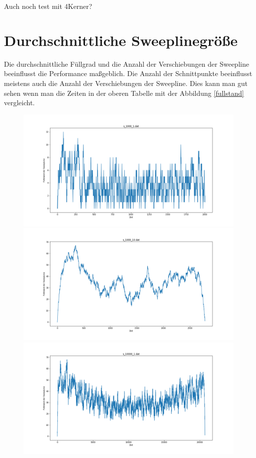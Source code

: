 \documentclass[conference]{IEEEtran}
\begin{document}
	Auch noch test mit 4Kerner?

	
	\section{Durchschnittliche Sweeplinegröße}
	Die durchschnittliche Füllgrad und die Anzahl der Verschiebungen der Sweepline beeinflusst die Performance maßgeblich. Die Anzahl der Schnittpunkte beeinflusst meistens auch die Anzahl der Verschiebungen der Sweepline. Dies kann man gut sehen wenn man die Zeiten in der oberen Tabelle mit der Abbildung \ref{fullstand} vergleicht. 

	\begin{figure}[!tbp]
		\centering
		\begin{minipage}[b]{0.5\textwidth}
			\includegraphics[width=\textwidth]{s1000+1.png}
		\end{minipage}
		\hfill
		\begin{minipage}[b]{0.5\textwidth}
			\includegraphics[width=\textwidth]{s1000+10.png}
		\end{minipage}
		\hfill
		\begin{minipage}[b]{0.5\textwidth}
			\includegraphics[width=\textwidth]{s10000+1.png}

\end{minipage}
\end{figure}
\end{document}
